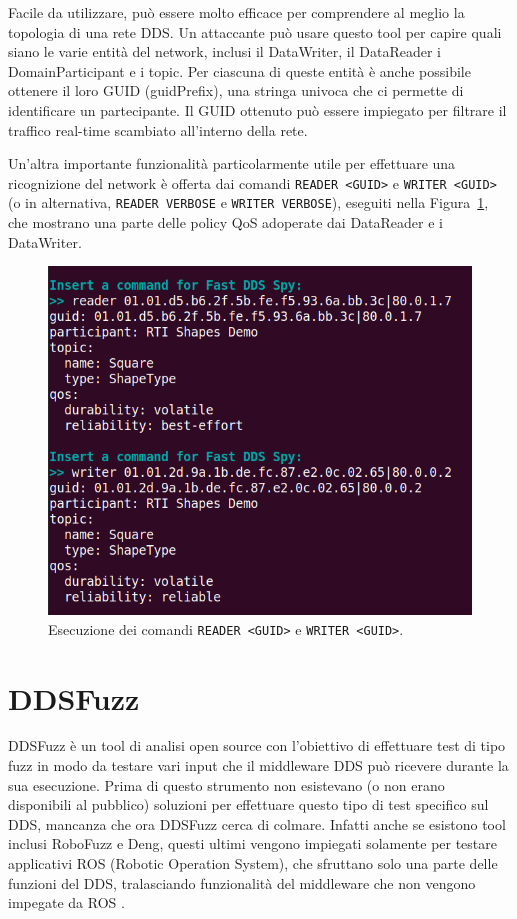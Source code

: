 Facile da utilizzare, può essere molto efficace per comprendere 
al meglio la topologia di una rete DDS. Un attaccante può usare questo 
tool per capire quali siano le varie entità del network, 
inclusi il DataWriter, il DataReader i DomainParticipant e i topic.
Per ciascuna di queste entità è anche possibile ottenere 
il loro GUID (guidPrefix), 
una stringa univoca che ci permette di identificare un partecipante.
Il GUID ottenuto può essere impiegato 
per filtrare il traffico 
real-time scambiato
all'interno della rete.

Un'altra importante funzionalità particolarmente utile per effettuare
una ricognizione del
network è offerta dai
comandi \texttt{READER <GUID>} e \texttt{WRITER <GUID>} (o in alternativa,
\texttt{READER VERBOSE} e \texttt{WRITER VERBOSE}), eseguiti nella
Figura~\ref{fastddsspyQoS}, che mostrano
una parte delle policy QoS adoperate dai DataReader e i DataWriter.

\begin{figure}[H]
    \centering
    \includegraphics[width=12cm, keepaspectratio]{img/fastddsspyQoS.png}
    \caption{Esecuzione dei comandi \texttt{READER <GUID>} 
    e \texttt{WRITER <GUID>}.}
    \label{fastddsspyQoS}
\end{figure}

\section{DDSFuzz}
DDSFuzz è un tool di analisi open source con l'obiettivo di 
effettuare test di tipo fuzz
in modo da testare vari input che il middleware DDS può
ricevere durante la sua esecuzione. Prima di questo strumento 
non esistevano (o non erano disponibili al pubblico) soluzioni
per effettuare questo tipo di test specifico sul DDS, mancanza
che ora DDSFuzz cerca di colmare. Infatti anche se esistono tool 
inclusi RoboFuzz e Deng, questi ultimi vengono impiegati solamente
per testare applicativi ROS (Robotic Operation System), che 
sfruttano solo una parte delle funzioni del DDS, tralasciando
funzionalità del middleware che non vengono impegate
da ROS \cite{10.1145/3691620.3695073}.\label{ddsfuzz}


